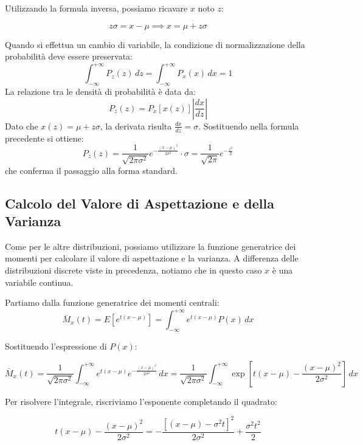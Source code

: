 \documentclass[openany,a4paper,12pt]{book}
\theoremstyle{remark}
\begin{document}
Utilizzando la formula inversa, possiamo ricavare $x$ noto $z$:

\begin{equation}
z\sigma = x - \mu \implies x = \mu + z\sigma
\end{equation}

\begin{nota}
Quando si effettua un cambio di variabile, la condizione di normalizzazione della probabilità deve essere preservata:
\[
\int_{-\infty}^{+\infty} P_z(z) \, dz = \int_{-\infty}^{+\infty} P_x(x) \, dx = 1
\]
La relazione tra le densità di probabilità è data da:
\[
P_z(z) = P_x [x(z)] \left| \frac{dx}{dz} \right|
\]
Dato che $x(z) = \mu + z\sigma$, la derivata risulta $\frac{dx}{dz} = \sigma$. Sostituendo nella formula precedente si ottiene:
\[
P_z(z) = \frac{1}{\sqrt{2 \pi \sigma^2}} e^{-\frac{(x-\mu)^2}{2\sigma^2}} \cdot \sigma = \frac{1}{\sqrt{2 \pi}} e^{-\frac{z^2}{2}}
\]
che conferma il passaggio alla forma standard.
\end{nota}

\subsection*{Calcolo del Valore di Aspettazione e della Varianza}

Come per le altre distribuzioni, possiamo utilizzare la funzione generatrice dei momenti per calcolare il valore di aspettazione e la varianza. A differenza delle distribuzioni discrete viste in precedenza, notiamo che in questo caso $x$ è una variabile continua.

Partiamo dalla funzione generatrice dei momenti centrali:
\begin{equation}
\bar{M}_x(t) = E[e^{t(x-\mu)}] = \int_{-\infty}^{+\infty} e^{t(x-\mu)} P(x) \, dx
\end{equation}

Sostituendo l'espressione di $P(x)$:

\begin{equation}
\bar{M}_x(t) = \frac{1}{\sqrt{2\pi \sigma^2}} \int_{-\infty}^{+\infty} e^{t(x-\mu)} e^{-\frac{(x-\mu)^2}{2\sigma^2}} \, dx = \frac{1}{\sqrt{2\pi \sigma^2}} \int_{-\infty}^{+\infty} \exp \left[ t(x-\mu) - \frac{(x-\mu)^2}{2\sigma^2} \right] \, dx
\end{equation}

Per risolvere l'integrale, riscriviamo l'esponente completando il quadrato:

\begin{equation}
t(x-\mu) - \frac{(x-\mu)^2}{2\sigma^2} = - \frac{\left[ (x-\mu) - \sigma^2 t \right]^2}{2\sigma^2} + \frac{\sigma^2 t^2}{2}
\end{equation}
\end{document}

